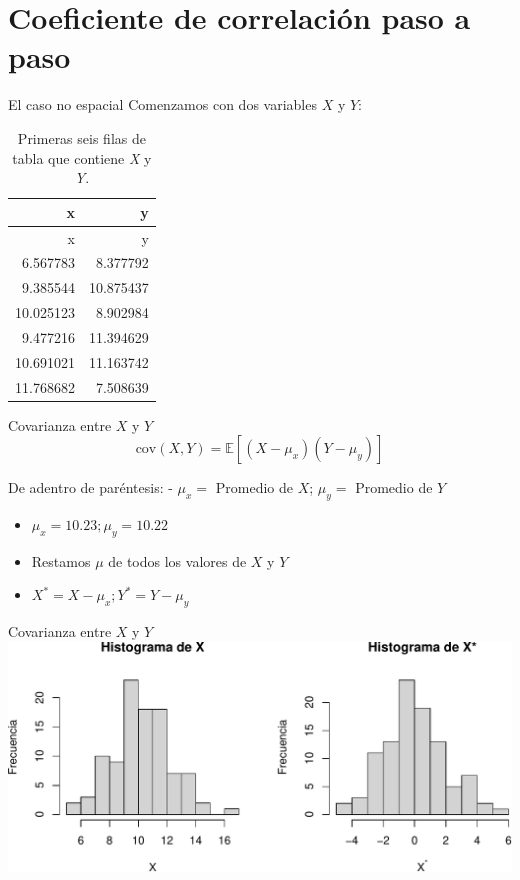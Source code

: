 \documentclass[
  11pt,
  ignorenonframetext,
]{beamer}
\begin{document}
\hypertarget{coeficiente-de-correlaciuxf3n-paso-a-paso}{%
\section{Coeficiente de correlación paso a
paso}\label{coeficiente-de-correlaciuxf3n-paso-a-paso}}

\begin{frame}{El caso no espacial}
\protect\hypertarget{el-caso-no-espacial}{}
Comenzamos con dos variables \(X\) y \(Y\):

\begin{longtable}[]{@{}rr@{}}
\caption{Primeras seis filas de tabla que contiene \emph{X} y
\emph{Y}.}\tabularnewline
\toprule()
x & y \\
\midrule()
\endfirsthead
\toprule()
x & y \\
\midrule()
\endhead
6.567783 & 8.377792 \\
9.385544 & 10.875437 \\
10.025123 & 8.902984 \\
9.477216 & 11.394629 \\
10.691021 & 11.163742 \\
11.768682 & 7.508639 \\
\bottomrule()
\end{longtable}
\end{frame}

\begin{frame}{Covarianza entre \(X\) y \(Y\)}
\protect\hypertarget{covarianza-entre-x-y-y}{}
\begin{equation}
\mathrm{cov}(X, Y) = \mathbb{E}[(X - \mu_x) (Y - \mu_y)]
\end{equation}

De adentro de paréntesis: - \(\mu_x =\) Promedio de \(X\); \(\mu_y =\)
Promedio de \(Y\)

\begin{itemize}
\item
  \(\mu_x = 10.23; \mu_y = 10.22\)
\item
  Restamos \(\mu\) de todos los valores de \(X\) y \(Y\)
\item
  \(X^*=X - \mu_x; Y^*=Y - \mu_y\)
\end{itemize}
\end{frame}

\begin{frame}{Covarianza entre \(X\) y \(Y\)}
\protect\hypertarget{covarianza-entre-x-y-y-1}{}
\includegraphics{Correlacion_files/figure-beamer/unnamed-chunk-4-1.pdf}
\end{frame}
\end{document}
